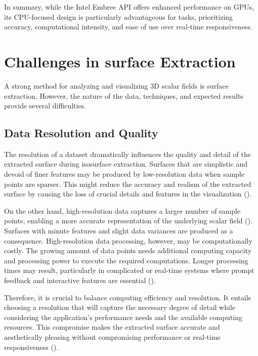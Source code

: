 In summary, while the Intel Embree API offers enhanced performance on GPUs, its CPU-focused design is particularly advantageous for tasks, prioritizing accuracy, computational intensity, and ease of use over real-time responsiveness.

\section{Challenges in surface Extraction} \label{Section 2.6}
A strong method for analyzing and visualizing 3D scalar fields is surface extraction. However, the nature of the data, techniques, and expected results provide several difficulties.
\subsection{Data Resolution and Quality}
The resolution of a dataset dramatically influences the quality and detail of the extracted surface during isosurface extraction. Surfaces that are simplistic and devoid of finer features may be produced by low-resolution data when sample points are sparser. This might reduce the accuracy and realism of the extracted surface by causing the loss of crucial details and features in the visualization (\cite{Knoll_2021}).

On the other hand, high-resolution data captures a larger number of sample points, enabling a more accurate representation of the underlying scalar field (\cite{Knoll_2021}). Surfaces with minute features and slight data variances are produced as a consequence. High-resolution data processing, however, may be computationally costly. The growing amount of data points needs additional computing capacity and processing power to execute the required computations. Longer processing times may result, particularly in complicated or real-time systems where prompt feedback and interactive features are essential (\cite{Knoll_2021}).

Therefore, it is crucial to balance computing efficiency and resolution. It entails choosing a resolution that will capture the necessary degree of detail while considering the application's performance needs and the available computing resources. This compromise makes the extracted surface accurate and aesthetically pleasing without compromising performance or real-time responsiveness (\cite{Knoll_2021}).

